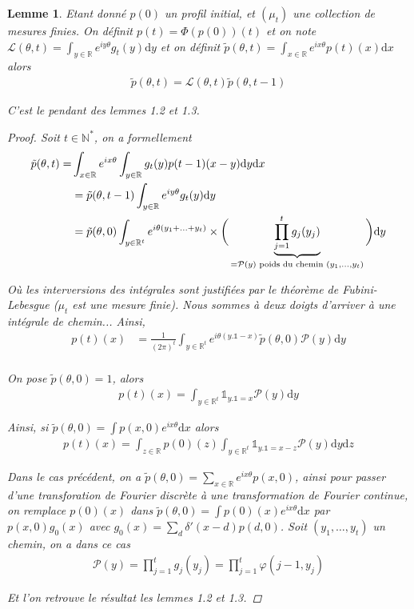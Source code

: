 \documentclass{article}
\newtheorem{lemma}[theorem]{Lemme}
\theoremstyle{definition}
\begin{document}
\begin{lemma}
	Etant donné $p(0)$ un profil initial, et $(\mu_t)$ une collection de mesures finies. On définit $p(t) = \Phi(p(0))(t)$ et on note $\mathcal{L}(\theta,t) = \int_{y\in\mathbb{R}}e^{iy \theta}g_t(y)\mathrm{d}y$ et on définit $\tilde{p}(\theta, t) = \int_{x\in\mathbb{R}} e^{i x \theta} p(t)(x)\mathrm{d}x$ alors 
	\begin{align*}
		\tilde{p}(\theta, t) = \mathcal{L}(\theta, t) \tilde{p}(\theta, t-1)
	\end{align*}

	C'est le pendant des lemmes 1.2 et 1.3.
	\begin{proof}
		Soit $t\in \mathbb{N}^*$, on a formellement
		\begin{align*}
			\tilde{p}(\theta, t) = &\int_{x\in\mathbb{R}}e^{ix\theta}\int_{y\in\mathbb{R}} g_t(y)p(t-1)(x-y)\mathrm{d}y\mathrm{d}x\\
			&= \tilde{p}(\theta, t-1)\int_{y\in\mathbb{R}}e^{iy\theta}g_t(y)\mathrm{d}y\\
			&= \tilde{p}(\theta, 0) \int_{y\in\mathbb{R}^t}e^{i\theta(y_1+\ldots+y_t)}\times\bigg(\underbrace{\prod_{j=1}^t g_j(y_j)}_{=\mathcal{P}(y) \textup{ poids du chemin } (y_1,\ldots, y_t)}\bigg)\mathrm{d}y
		\end{align*}

		Où les interversions des intégrales sont justifiées par le théorème de Fubini-Lebesgue ($\mu_t$ est une mesure finie). Nous sommes à deux doigts d'arriver à une intégrale de chemin... Ainsi,  
		\begin{align*}
			p(t)(x) &= \frac{1}{(2\pi)^t}\int_{y\in\mathbb{R}^t}e^{i\theta (y.\mathds{1}-x)}\tilde{p}(\theta, 0)\mathcal{P}(y) \mathrm{d}y\\
		\end{align*}

		On pose $\tilde{p}(\theta, 0)=1$, alors
		\begin{align*}
			p(t)(x) = \int_{y\in\mathbb{R}^t}\mathds{1}_{y.\mathds{1}=x} \mathcal{P}(y)\mathrm{d}y
		\end{align*}

		Ainsi, si $\tilde{p}(\theta, 0) = \int p(x,0)e^{i x \theta}\mathrm{d}x$ alors 
		\begin{align*}
			p(t)(x) = \int_{z\in\mathbb{R}} p(0)(z)\int_{y\in\mathbb{R}^t}\mathds{1}_{y.\mathds{1}=x-z}\mathcal{P}(y)\mathrm{d}y\mathrm{d}z
		\end{align*}

		Dans le cas précédent, on a $\tilde{p}(\theta, 0) = \sum_{x\in\mathbb{R}}e^{ix \theta}p(x,0)$, ainsi pour passer d'une transforation de Fourier discrète à une transformation de Fourier continue, on remplace $p(0)(x)$ dans $\tilde{p}(\theta, 0) = \int p(0)(x)e^{ix\theta}\mathrm{d}x$ par $p(x,0)g_0(x)$ avec $g_0(x) = \sum_{d}\delta'(x-d)p(d,0)$. Soit $(y_1,\ldots,y_t)$ un chemin, on a dans ce cas
		\begin{align*}
			\mathcal{P}(y) = \prod_{j=1}^t g_j(y_j) = \prod_{j=1}^t \varphi(j-1,y_j)
		\end{align*}

		Et l'on retrouve le résultat les lemmes 1.2 et 1.3.
	\end{proof}
\end{lemma}
\end{document}
